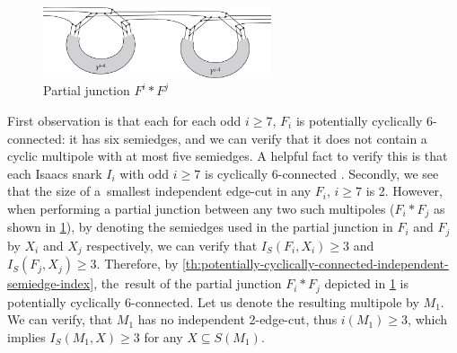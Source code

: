 \documentclass[12pt, twoside]{book}
\begin{document}
\begin{example}
	\begin{figure}
		\centering
		\includegraphics[width=0.6\textwidth]{images/Gi-first-partial-junction}
		\caption{Partial junction $F^i*F^j$}
		\label{fig:Gi-first-partial-junction}
	\end{figure}

	First observation is that each for each odd $i\geq 7$, $F_i$ is potentially cyclically \mbox{6-connected}: it has six semiedges, and we can verify that it does not contain a cyclic multipole with at most five semiedges. A helpful fact to verify this is that each Isaacs snark $I_i$ with odd $i\geq 7$ is cyclically 6-connected \cite{Mazak2022}. Secondly, we see that the size of a~smallest independent edge-cut in any $F_i$, $i\geq 7$ is 2. However, when performing a partial junction between any two such multipoles ($F_i*F_j$ as shown in \cref{fig:Gi-first-partial-junction}), by denoting the semiedges used in the partial junction in $F_i$ and $F_j$ by $X_i$ and $X_j$ respectively, we can verify that $I_S(F_i,X_i)\geq 3$ and $I_S(F_j,X_j)\geq 3$. Therefore, by \cref{th:potentially-cyclically-connected-independent-semiedge-index}, the~result of the partial junction $F_i*F_j$ depicted in \cref{fig:Gi-first-partial-junction} is potentially cyclically 6-connected. Let us denote the resulting multipole by $M_1$. We can verify, that $M_1$ has no independent 2-edge-cut, thus $i(M_1)\geq 3$, which implies $I_S(M_1, X)\geq 3$ for any $X\subseteq S(M_1)$.
		

\end{example}
\end{document}
